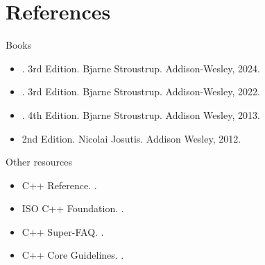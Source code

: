 \section{References}

\begin{frame}[t]{Books}
\begin{itemize}
  \item {}.
        3rd Edition.
        Bjarne Stroustrup.
        Addison-Wesley, 2024.

  \vfill
  \item {}.
        3rd Edition.
        Bjarne Stroustrup.
        Addison-Wesley, 2022.

  \vfill
  \item {}.
        4th Edition.
        Bjarne Stroustrup.
        Addison Wesley, 2013.

  \vfill
  \item {}
        2nd Edition.
        Nicolai Josutis.
        Addison Wesley, 2012.
\end{itemize}
\end{frame}

\begin{frame}[t]{Other resources}
\begin{itemize}
  \item C++ Reference.
        .

  \vfill
  \item ISO C++ Foundation.
        .

  \vfill
  \item C++ Super-FAQ.
        .

  \vfill
  \item C++ Core Guidelines.
        .
\end{itemize}
\end{frame}

